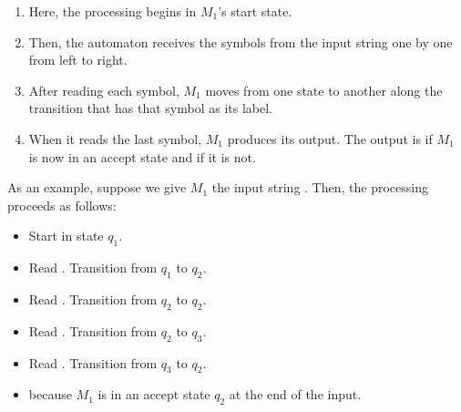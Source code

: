 \documentclass[letterpaper]{article}
\begin{document}
\begin{enumerate}
    \item Here, the processing begins in $M_1$'s start state. 
    \item Then, the automaton receives the symbols from the input string one by one from left to right. 
    \item After reading each symbol, $M_1$ moves from one state to another along the transition that has that symbol as its label. 
    \item When it reads the last symbol, $M_1$ produces its output. The output is  if $M_1$ is now in an accept state and  if it is not. 
\end{enumerate}
As an example, suppose we give $M_1$ the input string . Then, the processing proceeds as follows: 
\begin{itemize}
    \item Start in state $q_1$. 
    \item Read . Transition from $q_1$ to $q_2$. 
    \item Read . Transition from $q_2$ to $q_2$. 
    \item Read . Transition from $q_2$ to $q_3$. 
    \item Read . Transition from $q_3$ to $q_2$. 
    \item {} because $M_1$ is in an accept state $q_2$ at the end of the input. 
\end{itemize}
\end{document}
